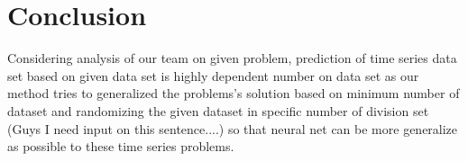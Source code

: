 \documentclass[conference]{IEEEtran}
\begin{document}
\section{Conclusion}
Considering analysis of our team on given problem, prediction of time series data set based on given data set is highly dependent  number on data set as our method tries to generalized the problems's solution based on minimum number of dataset and randomizing the given dataset in specific number of division set (Guys I need input on this sentence....) so that neural net can be more generalize  as possible to these time series problems.

\begin{IEEEbiography}


\end{IEEEbiography}
\end{document}
